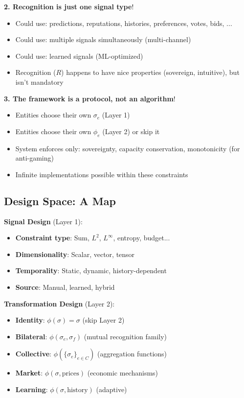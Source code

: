 \documentclass[11pt,a4paper]{article}
\theoremstyle{definition}
\theoremstyle{remark}
\begin{document}
\textbf{2. Recognition is just one signal type}!
\begin{itemize}
\item Could use: predictions, reputations, histories, preferences, votes, bids, ...
\item Could use: multiple signals simultaneously (multi-channel)
\item Could use: learned signals (ML-optimized)
\item Recognition ($R$) happens to have nice properties (sovereign, intuitive), but isn't mandatory
\end{itemize}

\textbf{3. The framework is a \textbf{protocol}, not an algorithm}!
\begin{itemize}
\item Entities choose their own $\sigma_e$ (Layer 1)
\item Entities choose their own $\phi_e$ (Layer 2) or skip it
\item System enforces only: sovereignty, capacity conservation, monotonicity (for anti-gaming)
\item Infinite implementations possible within these constraints
\end{itemize}

\subsection{Design Space: A Map}

\textbf{Signal Design} (Layer 1):
\begin{itemize}
\item \textbf{Constraint type}: Sum, $L^2$, $L^\infty$, entropy, budget...
\item \textbf{Dimensionality}: Scalar, vector, tensor
\item \textbf{Temporality}: Static, dynamic, history-dependent
\item \textbf{Source}: Manual, learned, hybrid
\end{itemize}

\textbf{Transformation Design} (Layer 2):
\begin{itemize}
\item \textbf{Identity}: $\phi(\sigma) = \sigma$ (skip Layer 2)
\item \textbf{Bilateral}: $\phi(\sigma_e, \sigma_f)$ (mutual recognition family)
\item \textbf{Collective}: $\phi(\{\sigma_e\}_{e \in C})$ (aggregation functions)
\item \textbf{Market}: $\phi(\sigma, \text{prices})$ (economic mechanisms)
\item \textbf{Learning}: $\phi(\sigma, \text{history})$ (adaptive)
\end{itemize}
\end{document}
